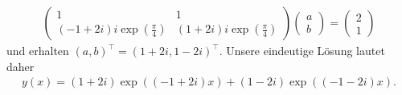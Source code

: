 \begin{solution}
\begin{enumerate}[label = \textbf{\alph*)}]
\begin{align*}
\begin{pmatrix}
      1 & 1\\
      (-1 + 2i)i\exp(\frac{\pi}{4}) & (1 + 2i)i\exp(\frac{\pi}{4})
    \end{pmatrix}
    \begin{pmatrix}
      a \\ b
    \end{pmatrix} =
    \begin{pmatrix}
      2 \\ 1
    \end{pmatrix}
  \end{align*}
  und erhalten $(a,b)^{\top} = (1+2i,1-2i)^{\top}$. Unsere eindeutige Lösung lautet daher
  \begin{align*}
    y(x) = (1+2i)\exp((-1 + 2i)x) + (1-2i)\exp((-1-2i)x).
  \end{align*}
\end{enumerate}
\end{solution}
